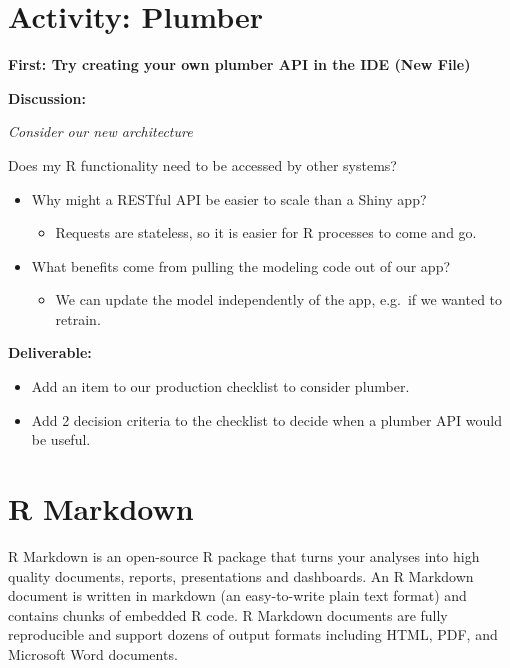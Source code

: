 \documentclass[]{book}
\providecommand{\tightlist}{%
  \setlength{\itemsep}{0pt}\setlength{\parskip}{0pt}}
\theoremstyle{definition}
\theoremstyle{definition}
\theoremstyle{definition}
\theoremstyle{remark}
\begin{document}
\hypertarget{activity-plumber}{%
\section{Activity: Plumber}\label{activity-plumber}}

\textbf{First: Try creating your own plumber API in the IDE (New File)}

\textbf{Discussion:}

\emph{Consider our new architecture}

Does my R functionality need to be accessed by other systems?

\begin{itemize}
\tightlist
\item
  Why might a RESTful API be easier to scale than a Shiny app?

  \begin{itemize}
  \tightlist
  \item
    Requests are stateless, so it is easier for R processes to come and
    go.
  \end{itemize}
\item
  What benefits come from pulling the modeling code out of our app?

  \begin{itemize}
  \tightlist
  \item
    We can update the model independently of the app, e.g.~if we wanted
    to retrain.
  \end{itemize}
\end{itemize}

\textbf{Deliverable:}

\begin{itemize}
\tightlist
\item
  Add an item to our production checklist to consider plumber.
\item
  Add 2 decision criteria to the checklist to decide when a plumber API
  would be useful.
\end{itemize}

\hypertarget{r-markdown}{%
\section{R Markdown}\label{r-markdown}}

R Markdown is an open-source R package that turns your analyses into
high quality documents, reports, presentations and dashboards. An R
Markdown document is written in markdown (an easy-to-write plain text
format) and contains chunks of embedded R code. R Markdown documents are
fully reproducible and support dozens of output formats including HTML,
PDF, and Microsoft Word documents.
\end{document}
